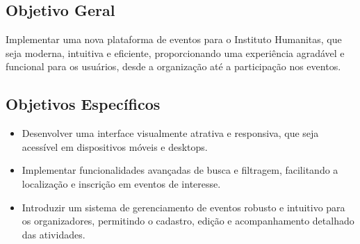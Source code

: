 \subsection{Objetivo Geral}

Implementar uma nova plataforma de eventos para o Instituto Humanitas, que seja moderna, intuitiva e eficiente, proporcionando uma experiência agradável e funcional para os usuários, desde a organização até a participação nos eventos.


\subsection{Objetivos Específicos}

\begin{itemize}
  \item Desenvolver uma interface visualmente atrativa e responsiva, que seja acessível em dispositivos móveis e desktops.
  \item Implementar funcionalidades avançadas de busca e filtragem, facilitando a localização e inscrição em eventos de interesse.
  \item Introduzir um sistema de gerenciamento de eventos robusto e intuitivo para os organizadores, permitindo o cadastro, edição e acompanhamento detalhado das atividades.
\end{itemize}